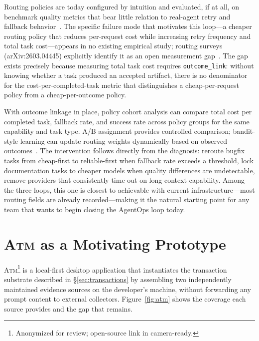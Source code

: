 \documentclass[sigconf,anonymous,review]{acmart}
\newcommand{\atm}{\textsc{Atm}\xspace}
\begin{document}
Routing policies are today configured by intuition and evaluated,
if at all, on benchmark quality metrics that bear little relation to
real-agent retry and fallback behavior~\cite{routingsurvey2026}.
The specific failure mode that motivates this loop---a cheaper
routing policy that reduces per-request cost while increasing retry
frequency and total task cost---appears in no existing empirical
study; routing surveys (arXiv:2603.04445) explicitly identify it as
an open measurement gap~\cite{routingsurvey2026, routecollapse2026}.
The gap exists precisely because measuring total task cost requires
\texttt{outcome\_link}: without knowing whether a task produced an
accepted artifact, there is no denominator for the cost-per-completed-task
metric that distinguishes a cheap-per-request policy from a
cheap-per-outcome policy.

With outcome linkage in place, policy cohort analysis can compare
total cost per completed task, fallback rate, and success rate across
policy groups for the same capability and task type. A/B assignment
provides controlled comparison; bandit-style learning can update
routing weights dynamically based on observed outcomes~\cite{%
frugalgpt2023, routellm2024}. The intervention follows directly from
the diagnosis: reroute bugfix tasks from cheap-first to
reliable-first when fallback rate exceeds a threshold, lock
documentation tasks to cheaper models when quality differences are
undetectable, remove providers that consistently time out on
long-context capability. Among the three loops, this one is closest
to achievable with current infrastructure---most routing fields are
already recorded---making it the natural starting point for any
team that wants to begin closing the AgentOps loop today.

\section{\atm as a Motivating Prototype}
\label{sec:atm}

\atm\footnote{Anonymized for review; open-source link in
camera-ready.} is a local-first desktop application that
instantiates the transaction substrate described in
\S\ref{sec:transactions} by assembling two independently
maintained evidence sources on the developer's machine, without
forwarding any prompt content to external collectors.
Figure~\ref{fig:atm} shows the coverage each source provides
and the gap that remains.
\end{document}

